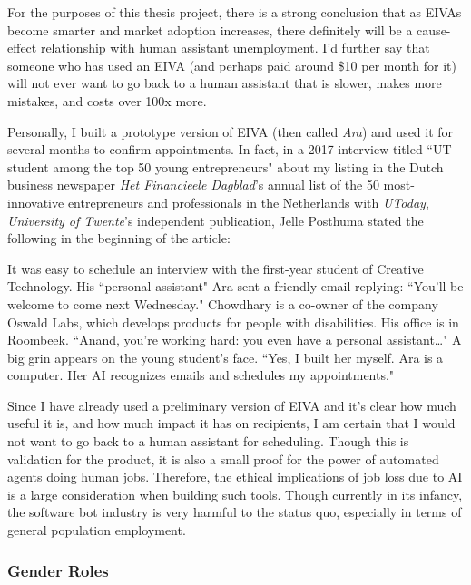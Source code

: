 \documentclass{article}
\begin{document}
For the purposes of this thesis project, there is a strong conclusion that as EIVAs become smarter and market adoption increases, there definitely will be a cause-effect relationship with human assistant unemployment. I'd further say that someone who has used an EIVA (and perhaps paid around \$10 per month for it) will not ever want to go back to a human assistant that is slower, makes more mistakes, and costs over 100x more.

Personally, I built a prototype version of EIVA (then called \emph{Ara}) and used it for several months to confirm appointments. In fact, in a 2017 interview titled ``UT student among the top 50 young entrepreneurs" about my listing in the Dutch business newspaper \emph{Het Financieele Dagblad}'s annual list of the 50 most-innovative entrepreneurs and professionals in the Netherlands with \emph{UToday}, \emph{University of Twente}'s independent publication, Jelle Posthuma stated the following in the beginning of the article:

\begin{displayquote}
It was easy to schedule an interview with the first-year student of Creative Technology. His ``personal assistant" Ara sent a friendly email replying: ``You’ll be welcome to come next Wednesday." Chowdhary is a co-owner of the company Oswald Labs, which develops products for people with disabilities. His office is in Roombeek. ``Anand, you’re working hard: you even have a personal assistant…" A big grin appears on the young student’s face. ``Yes, I built her myself. Ara is a computer. Her AI recognizes emails and schedules my appointments."
\end{displayquote}

Since I have already used a preliminary version of EIVA and it's clear how much useful it is, and how much impact it has on recipients, I am certain that I would not want to go back to a human assistant for scheduling. Though this is validation for the product, it is also a small proof for the power of automated agents doing human jobs. Therefore, the ethical implications of job loss due to AI is a large consideration when building such tools. Though currently in its infancy, the software bot industry is very harmful to the status quo, especially in terms of general population employment.

\subsubsection{Gender Roles}
\end{document}
